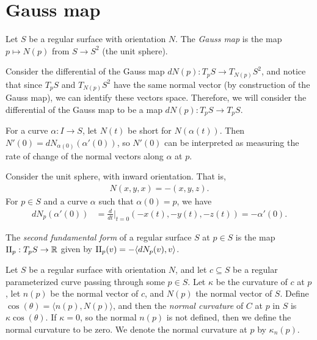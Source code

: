 \section{Gauss map}

\begin{defn}
    Let $S$ be a regular surface with orientation $N$. The \emph{Gauss map} is the map $p \mapsto N(p)$ from $S \to S^2$ (the unit sphere).
\end{defn}

\begin{rmk}
    Consider the differential of the Gauss map $dN(p): T_pS \to T_{N(p)}S^2$, and notice that since $T_pS$ and $T_{N(p)}S^2$ have the same normal vector (by construction of the Gauss map), we can identify these vectors space. Therefore, we will consider the differential of the Gauss map to be a map $dN(p): T_pS \to T_pS$.
\end{rmk}

\begin{rmk}
    For a curve $\alpha: I \to S$, let $N(t)$ be short for $N(\alpha(t))$. Then $N'(0) = dN_{\alpha(0)}(\alpha'(0))$, so $N'(0)$ can be interpreted as measuring the rate of change of the normal vectors along $\alpha$ at $p$. 
\end{rmk}

\begin{exmp}
    Consider the unit sphere, with inward orientation. That is,
    \begin{align*}
        N(x,y,x) = -(x,y,z).
    \end{align*}
    For $p \in S$ and a curve $\alpha$ such that $\alpha(0) = p$, we have
    \begin{align*}
        dN_p(\alpha'(0)) &= \frac{d}{dt}|_{t=0}(-x(t), -y(t), -z(t)) = -\alpha'(0).
    \end{align*}
\end{exmp}

\begin{defn}
    The \emph{second fundamental form} of a regular surface $S$ at $p \in S$ is the map $\operatorname{II}_p: T_pS \to \mathbb{R}$ given by $\operatorname{II}_p(v) = -\langle dN_p(v), v\rangle$.
\end{defn}

\begin{defn}
    Let $S$ be a regular surface with orientation $N$, and let $c \subseteq S$ be a regular parameterized curve passing through some $p \in S$. Let $\kappa$ be the curvature of $c$ at $p$, let $n(p)$ be the normal vector of $c$, and $N(p)$ the normal vector of $S$. Define $\cos(\theta) = \langle n(p), N(p) \rangle$, and then the \emph{normal curvature} of $C$ at $p$ in $S$ is $\kappa\cos(\theta)$. If $\kappa = 0$, so the normal $n(p)$ is not defined, then we define the normal curvature to be zero. We denote the normal curvature at $p$ by $\kappa_n(p)$.
\end{defn}

